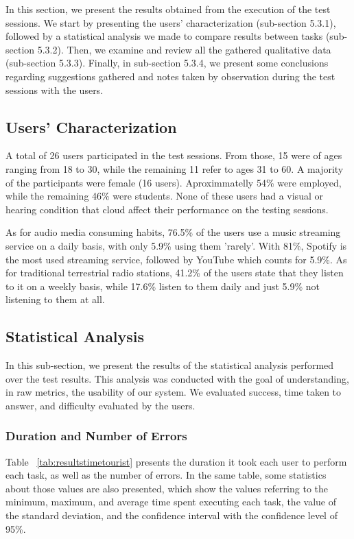 In this section, we present the results obtained from the execution of the test sessions. We start by presenting the users’ characterization (sub-section 5.3.1), followed by a statistical analysis we made to compare results between tasks (sub-section 5.3.2). Then, we examine and review all the gathered qualitative data (sub-section 5.3.3). Finally, in sub-section 5.3.4, we present some conclusions regarding suggestions gathered and notes taken by observation during the test sessions with the users.

\subsection{Users’ Characterization}

A total of 26 users participated in the test sessions. From those, 15 were of ages ranging from 18 to 30, while the remaining 11 refer to ages 31 to 60. A majority of the participants were female (16 users). Aproximmatelly 54\% were employed, while the remaining 46\% were students. None of these users had a visual or hearing condition that cloud affect their performance on the testing sessions.

As for audio media consuming habits, 76.5\% of the users use a music streaming service on a daily basis, with only 5.9\% using them 'rarely'. With 81\%, Spotify is the most used streaming service, followed by YouTube which counts for 5.9\%. As for traditional terrestrial radio stations, 41.2\% of the users state that they listen to it on a weekly basis, while 17.6\% listen to them daily and just 5.9\% not listening to them at all.

\subsection{Statistical Analysis}

In this sub-section, we present the results of the statistical analysis performed over the test results. This analysis was conducted with the goal of understanding, in raw metrics, the usability of our system. We evaluated success, time taken to answer, and difficulty evaluated by the users.

\subsubsection{Duration and Number of Errors}

Table ~\ref{tab:resultstimetourist} presents the duration it took each user to perform each task, as well as the number of errors. In the same table, some statistics about those values are also presented, which show the values referring to the minimum, maximum, and average time spent executing each task, the value of the standard deviation, and the confidence interval with the confidence level of 95\%.

